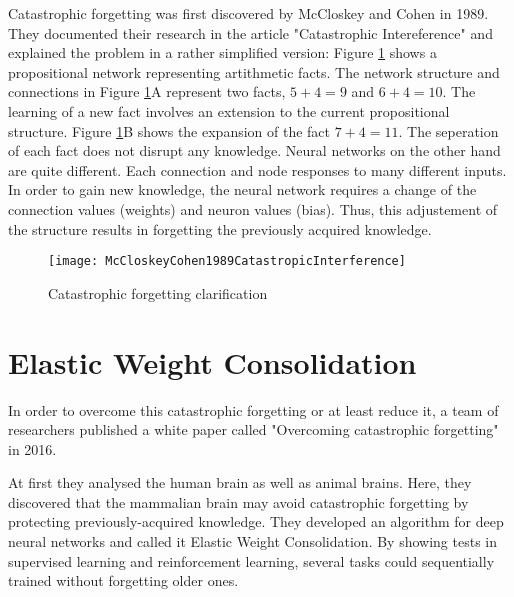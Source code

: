 Catastrophic forgetting was first discovered by McCloskey and Cohen in 1989.
They documented their research in the article "Catastrophic Intereference" \cite{psychology_learning_mccloskey_cohen} and explained the problem in a rather simplified version:
\cite{psychology_learning_mccloskey_cohen}
\newline
Figure \ref{fig:catastrophic_forgetting_clarification} shows a propositional network representing artithmetic facts.
The network structure and connections in Figure \ref{fig:catastrophic_forgetting_clarification}A represent two facts, $5 + 4 = 9$ and $6 + 4 = 10$.
The learning of a new fact involves an extension to the current propositional structure.
Figure \ref{fig:catastrophic_forgetting_clarification}B shows the expansion of the fact $7 + 4 = 11$.
The seperation of each fact does not disrupt any knowledge.
\cite{psychology_learning_mccloskey_cohen}
\newline
Neural networks on the other hand are quite different.
Each connection and node responses to many different inputs.
In order to gain new knowledge, the neural network requires a change of the connection values (weights) and neuron values (bias).
Thus, this adjustement of the structure results in forgetting the previously acquired knowledge.
\cite{psychology_learning_mccloskey_cohen}

\begin{figure}[H]
    \centering
    \texttt{[image: McCloskeyCohen1989CatastropicInterference]}
    \caption{\cite[page 148]{psychology_learning_mccloskey_cohen} Catastrophic forgetting clarification}
    \label{fig:catastrophic_forgetting_clarification}
\end{figure}

\section{Elastic Weight Consolidation}
\label{foundation_ewc}

In order to overcome this catastrophic forgetting or at least reduce it, a team of researchers published a white paper called "Overcoming catastrophic forgetting" in 2016.
\cite{elastic-weight-consolidation}

At first they analysed the human brain as well as animal brains.
Here, they discovered that the mammalian brain may avoid catastrophic forgetting by protecting previously-acquired knowledge.
They developed an algorithm for deep neural networks and called it Elastic Weight Consolidation.
By showing tests in supervised learning and reinforcement learning, several tasks could sequentially trained without forgetting older ones.
\cite{elastic-weight-consolidation}

